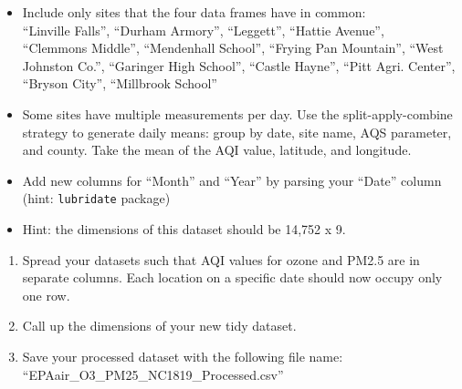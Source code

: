 \documentclass[
]{article}
\begin{document}
\begin{itemize}
\item
  Include only sites that the four data frames have in common:\\
  ``Linville Falls'', ``Durham Armory'', ``Leggett'', ``Hattie
  Avenue'',\\
  ``Clemmons Middle'', ``Mendenhall School'', ``Frying Pan Mountain'',
  ``West Johnston Co.'', ``Garinger High School'', ``Castle Hayne'',
  ``Pitt Agri. Center'', ``Bryson City'', ``Millbrook School''
\item
  Some sites have multiple measurements per day. Use the
  split-apply-combine strategy to generate daily means: group by date,
  site name, AQS parameter, and county. Take the mean of the AQI value,
  latitude, and longitude.
\item
  Add new columns for ``Month'' and ``Year'' by parsing your ``Date''
  column (hint: \texttt{lubridate} package)
\item
  Hint: the dimensions of this dataset should be 14,752 x 9.
\end{itemize}

\begin{enumerate}
\def\labelenumi{\arabic{enumi}.}
\setcounter{enumi}{9}
\item
  Spread your datasets such that AQI values for ozone and PM2.5 are in
  separate columns. Each location on a specific date should now occupy
  only one row.
\item
  Call up the dimensions of your new tidy dataset.
\item
  Save your processed dataset with the following file name:
  ``EPAair\_O3\_PM25\_NC1819\_Processed.csv''
\end{enumerate}
\end{document}
